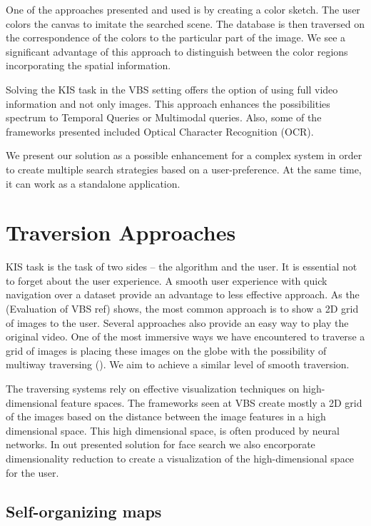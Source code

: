 One of the approaches presented and used is by creating a color sketch. The user colors the canvas to imitate the searched scene. The database is then traversed on the correspondence of the colors to the particular part of the image. We see a significant advantage of this approach to distinguish between the color regions incorporating the spatial information.
 
Solving the KIS task in the VBS setting offers the option of using full video information and not only images. This approach enhances the possibilities spectrum to Temporal Queries or Multimodal queries. Also, some of the frameworks presented included Optical Character Recognition (OCR).

We present our solution as a possible enhancement for a complex system in order to create multiple search strategies based on a user-preference. At the same time, it can work as a standalone application.

\section*{Traversion Approaches}

KIS task is the task of two sides -- the algorithm and the user. It is essential not to forget about the user experience. A smooth user experience with quick navigation over a dataset provide an advantage to less effective approach. As the  (Evaluation of VBS ref) shows, the most common approach is to show a 2D grid of images to the user. Several approaches also provide an easy way to play the original video. One of the most immersive ways we have encountered to traverse a grid of images is placing these images on the globe with the possibility of multiway traversing (). We aim to achieve a similar level of smooth traversion.

The traversing systems rely on effective visualization techniques on high-dimensional feature spaces. The frameworks seen at VBS create mostly a 2D grid of the images based on the distance between the image features in a high dimensional space. This high dimensional space, is often produced by neural networks. 
In out presented solution for face search we also encorporate dimensionality reduction to create a visualization of the high-dimensional space for the user. 

\subsection*{Self-organizing maps}

